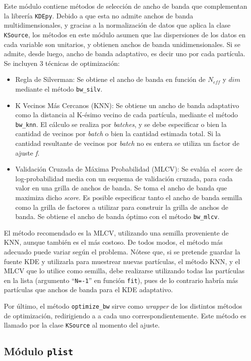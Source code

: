 Este módulo contiene métodos de selección de ancho de banda que complementan la librería \verb|KDEpy|. Debido a que esta no admite anchos de banda multidimensionales, y gracias a la normalización de datos que aplica la clase \verb|KSource|, los métodos en este módulo asumen que las dispersiones de los datos en cada variable son unitarios, y obtienen anchos de banda unidimensionales. Si se admite, desde luego, ancho de banda adaptativo, es decir uno por cada partícula. Se incluyen 3 técnicas de optimización:
\begin{itemize}
	\item Regla de Silverman: Se obtiene el ancho de banda en función de $N_{eff}$ y $dim$ mediante el método \verb|bw_silv|.
	\item K Vecinos Más Cercanos (KNN): Se obtiene un ancho de banda adaptativo como la distancia al K-ésimo vecino de cada partícula, mediante el método \verb|bw_knn|. El cálculo se realiza por \emph{batches}, y se debe especificar o bien la cantidad de vecinos por \emph{batch} o bien la cantidad estimada total. Si la cantidad resultante de vecinos por \emph{batch} no es entera se utiliza un factor de ajuste \emph{f}.
	\item Validación Cruzada de Máxima Probabilidad (MLCV): Se evalúa el \emph{score} de log-probabilidad media con un esquema de validación cruzada, para cada valor en una grilla de anchos de banda. Se toma el ancho de banda que maximiza dicho \emph{score}. Es posible especificar tanto el ancho de banda semilla como la grilla de factores a utilizar para construir la grilla de anchos de banda. Se obtiene el ancho de banda óptimo con el método \verb|bw_mlcv|.
\end{itemize}
El método recomendado es la MLCV, utilizando una semilla proveniente de KNN, aunque también es el más costoso. De todos modos, el método más adecuado puede variar según el problema. Nótese que, si se pretende guardar la fuente KDE y utilizarla para muestrear nuevas partículas, el método KNN, y el MLCV que lo utilice como semilla, debe realizarse utilizando todas las partículas en la lista (argumento ``\verb|N=-1|'' en función \verb|fit|), pues de lo contrario habría más partículas que anchos de banda para el KDE adaptativo.

Por último, el método \verb|optimize_bw| sirve como \emph{wrapper} de los distintos métodos de optimización, redirigiendo a a cada uno correspondientemente. Este método es llamado por la clase \verb|KSource| al momento del ajuste.


\subsection{Módulo \texttt{plist}}

